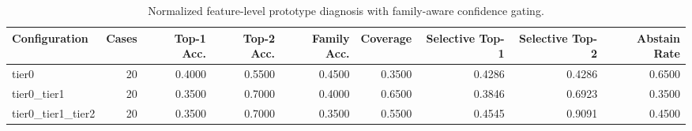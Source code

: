 \begin{table}[t]
\centering
\caption{Normalized feature-level prototype diagnosis with family-aware confidence gating.}
\label{tab:dice_stressor_hierarchical_diagnosis}
\footnotesize
\begin{tabular}{lrrrrrrrr}
\toprule
Configuration & Cases & Top-1 Acc. & Top-2 Acc. & Family Acc. & Coverage & Selective Top-1 & Selective Top-2 & Abstain Rate \\
\midrule
tier0 & 20 & 0.4000 & 0.5500 & 0.4500 & 0.3500 & 0.4286 & 0.4286 & 0.6500 \\
tier0_tier1 & 20 & 0.3500 & 0.7000 & 0.4000 & 0.6500 & 0.3846 & 0.6923 & 0.3500 \\
tier0_tier1_tier2 & 20 & 0.3500 & 0.7000 & 0.3500 & 0.5500 & 0.4545 & 0.9091 & 0.4500 \\
\bottomrule
\end{tabular}

\end{table}
